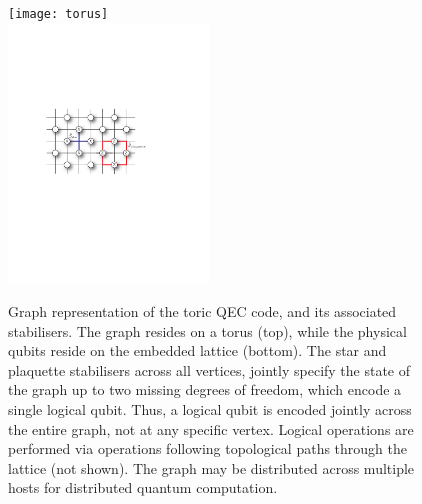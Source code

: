 \pubmode
	\begin{figure}[!htbp]
		\texttt{[image: torus]}\\
		\includegraphics[clip=true, width=0.475\textwidth]{toric_code}
		\captionspacefig \caption{Graph representation of the toric QEC code, and its associated stabilisers. The graph resides on a torus (top), while the physical qubits reside on the embedded lattice (bottom). The star and plaquette stabilisers across all vertices, jointly specify the state of the graph up to two missing degrees of freedom, which encode a single logical qubit. Thus, a logical qubit is encoded jointly across the entire graph, not at any specific vertex. Logical operations are performed via operations following topological paths through the lattice (not shown). The graph may be distributed across multiple hosts for distributed quantum computation.} \label{fig:toric_code}
	\end{figure}
\else
